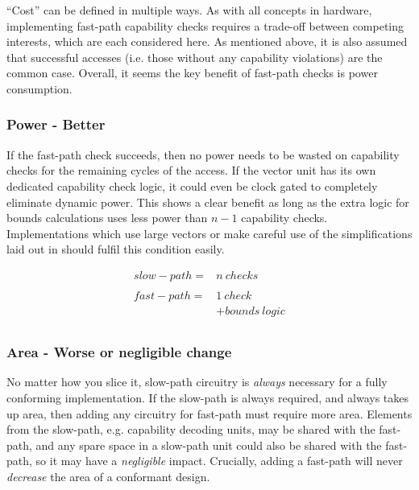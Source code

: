 \enquote{Cost} can be defined in multiple ways.
As with all concepts in hardware, implementing fast-path capability checks requires a trade-off between competing interests, which are each considered here.
As mentioned above, it is also assumed that successful accesses (i.e. those without any capability violations) are the common case.
Overall, it seems the key benefit of fast-path checks is power consumption.

\subsubsection*{Power - Better}
If the fast-path check succeeds, then no power needs to be wasted on capability checks for the remaining cycles of the access.
If the vector unit has its own dedicated capability check logic, it could even be clock gated to completely eliminate dynamic power.
This shows a clear benefit as long as the extra logic for bounds calculations uses less power than $n - 1$ capability checks.
Implementations which use large vectors or make careful use of the simplifications laid out in  should fulfil this condition easily.

\begin{equation}
\begin{array}{lr}
    \mathit{slow-path} =& n\ \mathit{checks} \\
&\\
    \mathit{fast-path} =& 1\ \mathit{check} \\
     &+ \mathit{bounds}\ \mathit{logic} \\

\end{array}
\end{equation}

\subsubsection*{Area - Worse or negligible change}
No matter how you slice it, slow-path circuitry is \emph{always} necessary for a fully conforming implementation.
If the slow-path is always required, and always takes up area, then adding any circuitry for fast-path must require more area.
Elements from the slow-path, e.g. capability decoding units, may be shared with the fast-path, and any spare space in a slow-path unit could also be shared with the fast-path, so it may have a \emph{negligible} impact.
Crucially, adding a fast-path will never \emph{decrease} the area of a conformant design.

